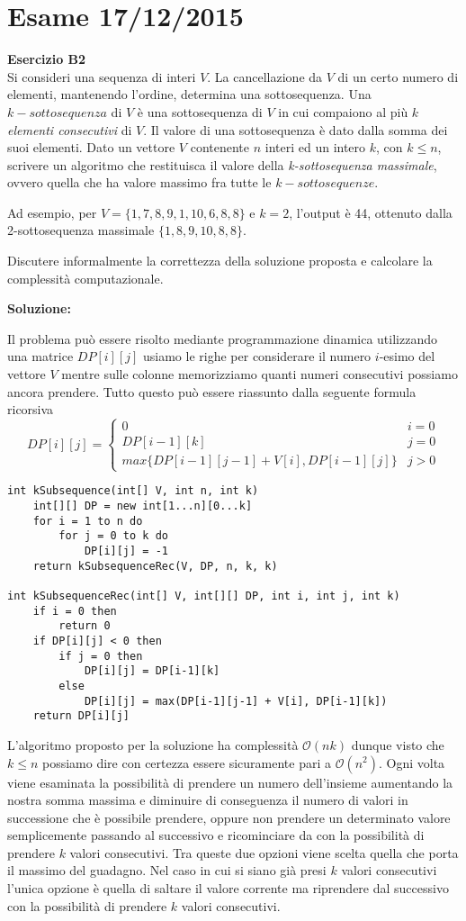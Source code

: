 \documentclass[../cheatSheetAlgoritmi.tex]{subfiles}
\begin{document}
\section{Esame 17/12/2015}
\textbf{Esercizio B2}\\
Si consideri una sequenza di interi $V$. La cancellazione da $V$ di un certo numero di elementi, mantenendo l'ordine, determina una sottosequenza. Una $k-sottosequenza$ di $V$ è una sottosequenza di $V$ in cui compaiono al più $k$ \emph{elementi consecutivi} di $V$. Il valore di una sottosequenza è dato dalla somma dei suoi elementi. Dato un vettore $V$ contenente $n$ interi ed un intero $k$, con $k \leq n$, scrivere un algoritmo che restituisca il valore della \emph{k-sottosequenza massimale}, ovvero quella che ha valore massimo fra tutte le $k-sottosequenze$.

Ad esempio, per $V=\{1,7,8,9,1,10,6,8,8\}$ e $k = 2$, l'output è 44, ottenuto dalla 2-sottosequenza massimale $\{1,8,9,10,8,8\}$.

Discutere informalmente la correttezza della soluzione proposta e calcolare la complessità computazionale.

\textbf{Soluzione:}

Il problema può essere risolto mediante programmazione dinamica utilizzando una matrice $DP[i][j]$ usiamo le righe per considerare il numero $i$-esimo del vettore $V$ mentre sulle colonne memorizziamo quanti numeri consecutivi possiamo ancora prendere. Tutto questo può essere riassunto dalla seguente formula ricorsiva
\begin{equation*}
  	DP[i][j]=\begin{cases}
  		0 & \text{$i = 0$}\\
  		DP[i-1][k] & \text{$j = 0$}\\
  		max\{DP[i-1][j-1] + V[i], DP[i-1][j]\} & \text{$j > 0$}
  	\end{cases}
\end{equation*}
\begin{lstlisting}[caption=k-sottosequenza contigua]
int kSubsequence(int[] V, int n, int k)
	int[][] DP = new int[1...n][0...k]
	for i = 1 to n do
		for j = 0 to k do
			DP[i][j] = -1
	return kSubsequenceRec(V, DP, n, k, k)
	
int kSubsequenceRec(int[] V, int[][] DP, int i, int j, int k)
	if i = 0 then 
		return 0
	if DP[i][j] < 0 then
		if j = 0 then
			DP[i][j] = DP[i-1][k]
		else
			DP[i][j] = max(DP[i-1][j-1] + V[i], DP[i-1][k])
	return DP[i][j]
\end{lstlisting}
L'algoritmo proposto per la soluzione ha complessità $\mathcal{O}(nk)$ dunque visto che $k \leq n$ possiamo dire con certezza essere sicuramente pari a $\mathcal{O}(n^{2})$. Ogni volta viene esaminata la possibilità di prendere un numero dell'insieme aumentando la nostra somma massima e diminuire di conseguenza il numero di valori in successione che è possibile prendere, oppure non prendere un determinato valore semplicemente passando al successivo e ricominciare da con la possibilità di prendere $k$ valori consecutivi. Tra queste due opzioni viene scelta quella che porta il massimo del guadagno. Nel caso in cui si siano già presi $k$ valori consecutivi l'unica opzione è quella di saltare il valore corrente ma riprendere dal successivo con la possibilità di prendere $k$ valori consecutivi.
 
\end{document}
